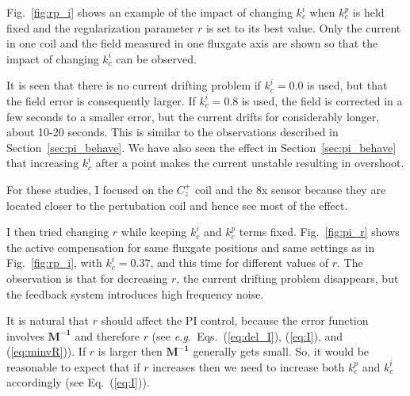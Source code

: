 Fig.~\ref{fig:rp_i} shows an example of the impact of changing $k_c^i$
when $k_c^p$ is held fixed and the regularization parameter $r$ is set
to its best value.  Only the current in one coil and the field
measured in one fluxgate axis are shown so that the impact of changing
$k_c^i$ can be observed.

It is seen that there is no current drifting problem if $k_c^i=0.0$ is
used, but that the field error is consequently larger.  If $k_c^i=0.8$
is used, the field is corrected in a few seconds to a smaller error,
but the current drifts for considerably longer, about 10-20 seconds.
This is similar to the observations described in
Section~\ref{sec:pi_behave}.  We have also seen the effect in
Section~\ref{sec:pi_behave} that increasing $k_c^i$ after a point
makes the current unstable resulting in overshoot.

For these studies, I focused on the $C_z^+$ coil and the 8x sensor
because they are located closer to the pertubation coil and hence see
most of the effect.



I then tried changing $r$ while keeping $k_c^i$ and $k_c^p$ terms
fixed.  Fig.~\ref{fig:pi_r} shows the active compensation for same
fluxgate positions and same settings as in Fig.~\ref{fig:rp_i}, with
$k_c^i=0.37$, and this time for different values of $r$. The
observation is that for decreasing $r$, the current drifting problem
disappears, but the feedback system introduces high frequency
noise.

It is natural that $r$ should affect the PI control, because the error
function involves $\bm{M^{-1}}$ and therefore $r$ (see
{\it e.g.}~Eqs.~(\ref{eq:del_I}), (\ref{eq:I}), and (\ref{eq:minvR})).  If
$r$ is larger then $\bm{M^{-1}}$ generally gets small.  So, it would be
reasonable to expect that if $r$ increases then we need to increase
both $k_c^p$ and $k_c^i$ accordingly (see Eq.~(\ref{eq:I})).


